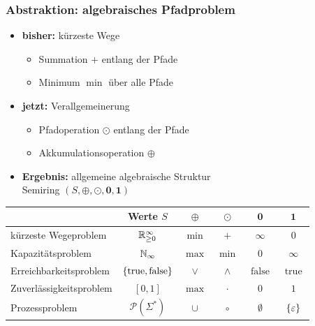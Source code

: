 \documentclass{beamer}
\DeclareMathOperator{\true}{true}
\DeclareMathOperator{\false}{false}
\begin{document}
\begin{frame} \frametitle{Abstraktion: algebraisches Pfadproblem}
	\small
	\begin{itemize}
		\item \textbf{bisher:} kürzeste Wege
		\begin{itemize}
			\item Summation $+$ entlang der Pfade
			\item Minimum $\min$ über alle Pfade
		\end{itemize}
		\item \textbf{jetzt:} Verallgemeinerung
		\begin{itemize}
			\item Pfadoperation $\odot$ entlang der Pfade
			\item Akkumulationsoperation $\oplus$
		\end{itemize}
		\item \textbf{Ergebnis:} allgemeine algebraische Struktur \\ Semiring $(S, \oplus, \odot, \mathbf{0}, \mathbf{1})$
	\end{itemize}

	\centering
	
	\begin{tabular}{lccccc}
		\hline
		& Werte $S$ & $\oplus$ & $\odot$ & $\mathbf{0}$ & $\mathbf{1}$ \\
		\hline
		kürzeste Wegeproblem & $\mathbb{R}_{\ge 0}^\infty$ & $\min$ & $+$ & $\infty$ & $0$ \\
		Kapazitätsproblem & $\mathbb{N}_\infty$ & $\max$ & $\min$ & $0$ & $\infty$ \\
		Erreichbarkeitsproblem & $\menge{\true, \false}$ & $\lor$ & $\land$ & $\false$ & $\true$ \\
		Zuverlässigkeitsproblem & $[0,1]$ & $\max$ & $\cdot$ & $0$ & $1$ \\
		Prozessproblem & $\mathcal{P}(\Sigma^\ast)$ & $\cup$ & $\circ$ & $\emptyset$ & $\left\{ \varepsilon \right\}$ \\ \hline
	\end{tabular}
\end{frame}
\end{document}
